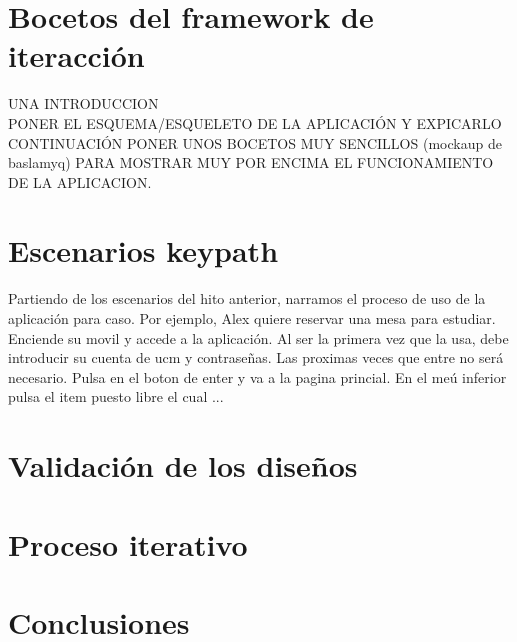 \documentclass[12pt]{article}
\begin{document}
\newpage
\section{Bocetos del framework de iteracción}

UNA INTRODUCCION\\

PONER EL ESQUEMA/ESQUELETO DE LA APLICACIÓN Y EXPICARLO\\

CONTINUACIÓN PONER UNOS  BOCETOS MUY SENCILLOS (mockaup de baslamyq) PARA MOSTRAR MUY POR ENCIMA EL FUNCIONAMIENTO DE LA APLICACION.\\


\newpage
\section{Escenarios keypath}

Partiendo de los escenarios del hito anterior, narramos el proceso de uso de la aplicación para caso. Por ejemplo, Alex quiere reservar una mesa para estudiar. Enciende su movil y accede a la aplicación. Al ser la primera vez que la usa, debe introducir su cuenta de ucm y contraseñas. Las proximas veces que entre no será necesario. Pulsa en el boton de enter y va a la pagina princial. En el meú inferior pulsa el item puesto libre el cual ...

\section{Validación de los diseños}

\section{Proceso iterativo}

\section{Conclusiones}
\end{document}
